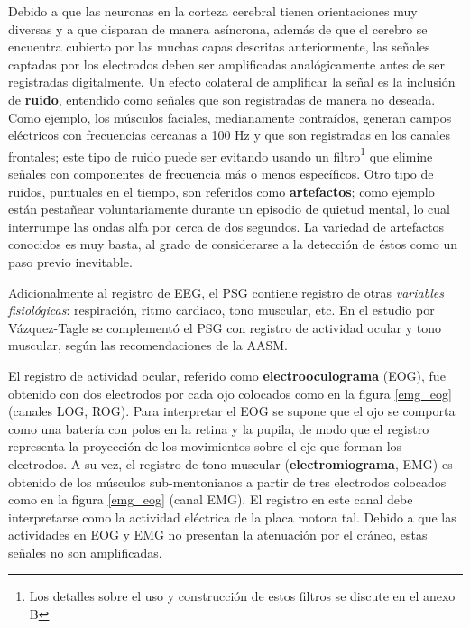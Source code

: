 
Debido a que las neuronas en la corteza cerebral tienen orientaciones muy diversas y a que disparan 
de manera asíncrona, además de que el cerebro se encuentra cubierto por las muchas capas descritas
anteriormente, las señales captadas por los electrodos deben ser amplificadas analógicamente antes 
de ser registradas digitalmente.
%
%
Un efecto colateral de amplificar la señal es la inclusión de \textbf{ruido}, entendido como 
señales que son registradas de manera no deseada.
Como ejemplo, los músculos faciales, medianamente contraídos, generan campos eléctricos con
frecuencias cercanas a 100 Hz y que son registradas en los canales frontales;
este tipo de ruido puede ser evitando usando un filtro\footnote{Los detalles sobre el uso y
construcción de estos filtros se discute en el anexo B} que elimine señales con componentes de
frecuencia más o menos específicos.
Otro tipo de ruidos, puntuales en el tiempo, son referidos como \textbf{artefactos}; como ejemplo
están pestañear voluntariamente durante un episodio de quietud mental, lo cual interrumpe las ondas 
alfa por cerca de dos segundos.
La variedad de artefactos conocidos es muy basta, al grado de
considerarse a la detección de éstos como un paso previo inevitable.

Adicionalmente al registro de EEG, el PSG contiene registro de otras \textit{variables fisiológicas}:
respiración, ritmo cardiaco, tono muscular, etc. En el estudio por Vázquez-Tagle se complementó el
PSG con registro de actividad ocular y tono muscular, según las recomendaciones de la AASM.

El registro de actividad ocular, referido como \textbf{electrooculograma} (EOG), fue obtenido
con dos electrodos por cada ojo colocados como en la figura \ref{emg_eog} 
(canales LOG, ROG).
Para interpretar el EOG
se supone que el ojo se comporta como una batería con polos en la retina y la pupila, de modo que
el registro representa la proyección de los movimientos sobre el eje que forman los electrodos. 
A su vez, el registro de
tono muscular (\textbf{electromiograma}, EMG) es obtenido de los músculos sub-mentonianos a partir 
de tres electrodos colocados como en la figura \ref{emg_eog} (canal EMG).
El registro en este canal debe interpretarse como la actividad eléctrica de la placa motora tal.
Debido a que las actividades en EOG y EMG no presentan la atenuación por el cráneo, estas señales
no son amplificadas.


